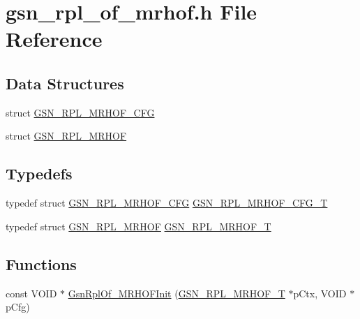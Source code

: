 \hypertarget{a00581}{
\section{gsn\_\-rpl\_\-of\_\-mrhof.h File Reference}
\label{a00581}
}
\subsection*{Data Structures}
\begin{DoxyCompactItemize}
\item 
struct \hyperlink{a00206}{GSN\_\-RPL\_\-MRHOF\_\-CFG}
\item 
struct \hyperlink{a00205}{GSN\_\-RPL\_\-MRHOF}
\end{DoxyCompactItemize}
\subsection*{Typedefs}
\begin{DoxyCompactItemize}
\item 
typedef struct \hyperlink{a00206}{GSN\_\-RPL\_\-MRHOF\_\-CFG} \hyperlink{a00581_a192505c4a0e602372e416f9f6d114792}{GSN\_\-RPL\_\-MRHOF\_\-CFG\_\-T}
\item 
typedef struct \hyperlink{a00205}{GSN\_\-RPL\_\-MRHOF} \hyperlink{a00581_a085534cd67ed162483e6c2e48bc582fc}{GSN\_\-RPL\_\-MRHOF\_\-T}
\end{DoxyCompactItemize}
\subsection*{Functions}
\begin{DoxyCompactItemize}
\item 
const VOID $\ast$ \hyperlink{a00581_a1a7c416e91c4413a94eb1f97d97e1646}{GsnRplOf\_\-MRHOFInit} (\hyperlink{a00205}{GSN\_\-RPL\_\-MRHOF\_\-T} $\ast$pCtx, VOID $\ast$pCfg)
\end{DoxyCompactItemize}


